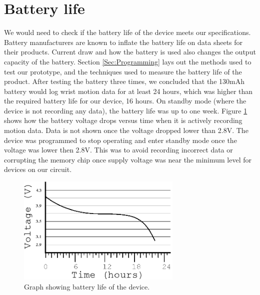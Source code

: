 \section{Battery life}
\label{Sec:ResultsBatteryLife}
We would need to check if the battery life of the device meets our specifications.
Battery manufacturers are known to inflate the battery life on data sheets for their products.
Current draw and how the battery is used also changes the output capacity of the battery.
Section \ref{Sec:Programming} lays out the methods used to test our prototype,
and the techniques used to measure the battery life of the product.
After testing the battery three times,
we concluded that the 130mAh battery would log wrist motion data for at least 24 hours,
which was higher than the required battery life for our device,
16 hours.
On standby mode (where the device is not recording any data), the battery life was up to one week.
Figure \ref{Fig:BatteryGraph} shows how the battery voltage drops versus time when it is actively recording motion data.
Data is not shown once the voltage dropped lower than 2.8V.
The device was programmed to stop operating and enter standby mode
once the voltage was lower then 2.8V.
This was to avoid recording incorrect data or corrupting the memory chip once supply
voltage was near the minimum level for devices on our circuit.

\begin{figure}
\begin{center}
\includegraphics[width=0.7\textwidth]{images/BattLife.eps}
\caption{Graph showing battery life of the device.}
\label{Fig:BatteryGraph}
\end{center}
\end{figure}

